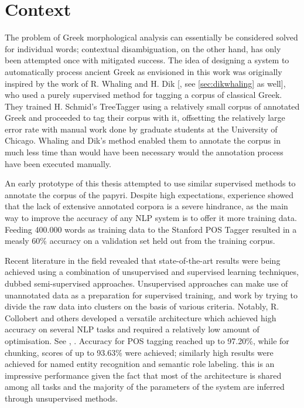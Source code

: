 \section{Context}

The problem of Greek morphological analysis can essentially be
considered solved for individual words; contextual disambiguation, on
the other hand, has only been attempted once with mitigated
success. The idea of designing a system to automatically process
ancient Greek as envisioned in this work was originally inspired by
the work of R. Whaling and H. Dik [\cite{dik2008,dik2009}, see
\ref{sec:dikwhaling} as well], who used a purely supervised method for
tagging a corpus of classical Greek. They trained H. Schmid's
TreeTagger using a relatively small corpus of annotated Greek and
proceeded to tag their corpus with it, offsetting the relatively large
error rate with manual work done by graduate students at the
University of Chicago. Whaling and Dik's method enabled them to
annotate the corpus in much less time than would have been necessary
would the annotation process have been executed manually.

An early prototype of this thesis attempted to use similar supervised
methods to annotate the corpus of the papyri. Despite high
expectations, experience showed that the lack of extensive annotated
corpora is a severe hindrance, as the main way to improve the accuracy
of any NLP system is to offer it more training data. Feeding 400.000
words as training data to the Stanford POS Tagger resulted in a measly
60\% accuracy on a validation set held out from the training corpus.

Recent literature in the field revealed that state-of-the-art results
were being achieved using a combination of unsupervised and supervised
learning techniques, dubbed semi-supervised approaches. Unsupervised
approaches can make use of unannotated data as a preparation for
supervised training, and work by trying to divide the raw data into
clusters on the basis of various criteria. Notably, R. Collobert and
others developed a versatile architecture which achieved high accuracy
on several NLP tasks and required a relatively low amount of
optimisation. See \citet{collobert2008}, \citet{collobert-2011}. Accuracy
for POS tagging reached up to 97.20\%, while for chunking, scores of
up to 93.63\% were achieved; similarly high results were achieved for
named entity recognition and semantic role labeling. this is an
impressive performance given the fact that most of the architecture is
shared among all tasks and the majority of the parameters of the
system are inferred through unsupervised methods. 

